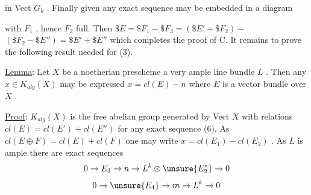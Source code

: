 
in Vect $G_k$ . Finally given any exact sequence  may be
embedded in a diagram


with $F_1$ , hence $F_2$ full. Then $\$E = \$F_1 - \$F_3 = (\$E' + \$F_2) -$
$(\$F_2 - \$E'') = \$E' + \$E''$ which completes the proof of C.
It remains to prove the following result needed for (3).

\uline{Lemma}: Let $X$ be a noetherian prescheme  a very
ample line bundle $L$ . Then any $x \in K_{alg}(X)$ may be expressed
$x = cl(E) - n$ where $E$ is a vector bundle over $X$ .

\uline{Proof}: $K_{alg}(X)$ is the free abelian group generated by Vect $X$
with relations $cl(E) = cl(E') + cl(E'')$ for any exact sequence (6).
As $cl(E \oplus F) = cl(E) + cl(F)$ one may write $x = cl(E_1) - cl(E_2)$ .
As $L$ is ample there are exact sequences
\[ 0 \to E_3 \to n \to L^k \otimes \unsure{E_2^*} \to 0 \]
\[ 0 \to \unsure{E_4} \to m \to L^k \to 0 \]

